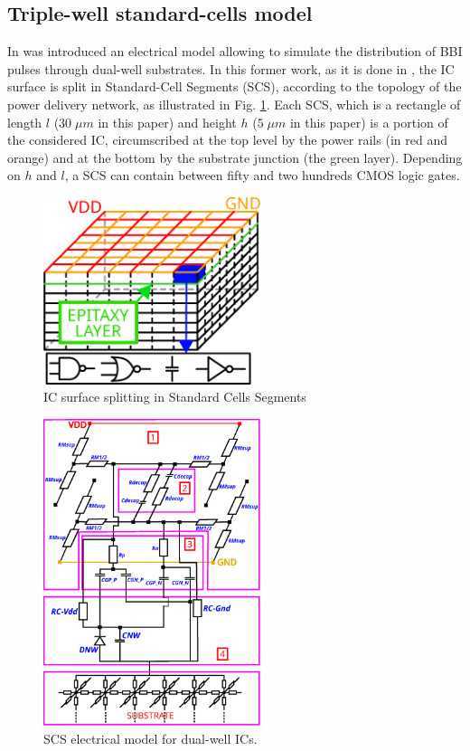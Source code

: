 \documentclass[10pt, conference, compsocconf]{IEEEtran}
\begin{document}
\subsection{Triple-well standard-cells model}
In \cite{mybbi} was introduced an electrical model allowing to simulate the distribution of BBI pulses through dual-well substrates. In this former work, as it is done in \cite{mathieuEMFI}, the IC surface is split in Standard-Cell Segments (SCS), according to the topology of the power delivery network, as illustrated in Fig. \ref{fig_scs_p}.
Each SCS, which is a rectangle of length $l$ ($30 \; \mu m$ in this paper) and height $h$ ($5 \; \mu m$ in this paper) is a portion of the considered IC, circumscribed at the top level by the power rails (in red and orange) and at the bottom by the substrate junction (the green layer). Depending on $h$ and $l$, a SCS can contain between fifty and two hundreds CMOS logic gates.

\begin{figure}[!t]
\centering
\includegraphics[width=2.5in]{IC_3D_STD_CELL.eps}
\caption{IC surface splitting in Standard Cells Segments}
\label{fig_scs_p}
\end{figure}

\begin{figure}[!t]
\centering
\includegraphics[width=2.5in]{SCS_DW.eps}
\caption{SCS electrical model for dual-well ICs.}
\label{fig_scs_dw}
\end{figure}
\end{document}
